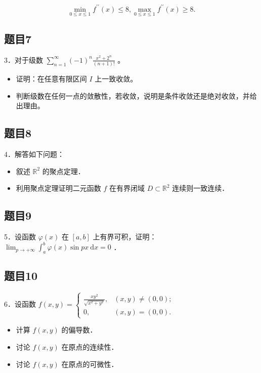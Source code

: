 \documentclass{article}
\begin{document}
\[
\min _{0 \leq x \leq 1} f^{\prime \prime}(x) \leq 8, \max _{0 \leq x \leq 1} f^{\prime \prime}(x) \geq 8 .
\]

\subsection{题目7}
3．对于级数 \(\sum_{n=1}^{\infty}(-1)^{n} \frac{x^{2}+2^{n}}{(n+1)!}\) 。

\begin{itemize}
  \item[（1）] 证明：在任意有限区间 \(I\) 上一致收敛。
  \item[（2）] 判断级数在任何一点的敛散性，若收敛，说明是条件收敛还是绝对收敛，并给出理由。
\end{itemize}

\subsection{题目8}
4．解答如下问题：

\begin{itemize}
  \item[（1）] 叙述 \(\mathbb{R}^{2}\) 的聚点定理．
  \item[（2）] 利用聚点定理证明二元函数 \(f\) 在有界闭域 \(D \subset \mathbb{R}^{2}\) 连续则一致连续．
\end{itemize}

\subsection{题目9}
5．设函数 \(\varphi(x)\) 在 \([a, b]\) 上有界可积，证明： \(\lim _{p \rightarrow+\infty} \int_{a}^{b} \varphi(x) \sin p x \mathrm{~d} x=0\) ．

\subsection{题目10}
6．设函数 \(f(x, y)= \begin{cases}\frac{x y^{2}}{\sqrt{x^{2}+y^{2}}}, & (x, y) \neq(0,0) ; \\ 0, & (x, y)=(0,0) .\end{cases}\)

\begin{itemize}
  \item[（1）] 计算 \(f(x, y)\) 的偏导数．
  \item[（2）] 讨论 \(f(x, y)\) 在原点的连续性．
  \item[（3）] 讨论 \(f(x, y)\) 在原点的可微性．
\end{itemize}
\end{document}
